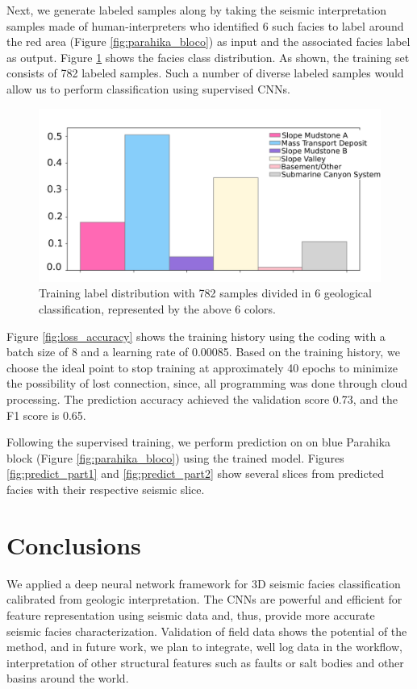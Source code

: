 \documentclass[twoside,letterpaper,twocolumn]{article}
\begin{document}
Next, we generate labeled samples along by taking
the seismic interpretation samples made of human-interpreters who identified 6 such facies to label around the red area (Figure \ref{fig:parahika_bloco}) as input and the associated facies label as output.
Figure \ref{fig:label_distribution} shows the facies class distribution.
As shown, the training set consists of 782 labeled samples. Such a number of diverse labeled samples would allow us to perform classification using supervised CNNs.
\begin{figure}[h!]
	\centering
	\includegraphics[width=\columnwidth]{Figures/label_distribution.pdf}
	\caption{Training label distribution with 782 samples divided in 6 geological classification, represented by the above 6 colors.}
	\label{fig:label_distribution}
\end{figure}

Figure \ref{fig:loss_accuracy} shows the training history using the \citet{3dFacies(2021)} coding with a batch size of 8 and a learning rate of 0.00085. 
Based on the training history, we choose the ideal point to stop training at approximately 40 epochs to minimize the possibility of lost connection, since, all programming was done through cloud processing. 
The prediction accuracy achieved the validation score 0.73, and the F1 score is 0.65.

Following the supervised training, we perform prediction on on blue Parahika block (Figure \ref{fig:parahika_bloco}) using the trained model. 
Figures \ref{fig:predict_part1} and \ref{fig:predict_part2} show several slices from predicted facies with their respective seismic slice.

\section{Conclusions}


We applied a deep neural network framework for 3D seismic facies classification calibrated from geologic interpretation. 
The CNNs are powerful and efficient for feature representation using seismic data and, thus, provide more accurate seismic facies characterization.
Validation of field data shows the potential of the method, and in future work, we plan to integrate, well log data in the workflow, interpretation of other structural features such as faults or salt bodies and other basins around the world.
\end{document}
